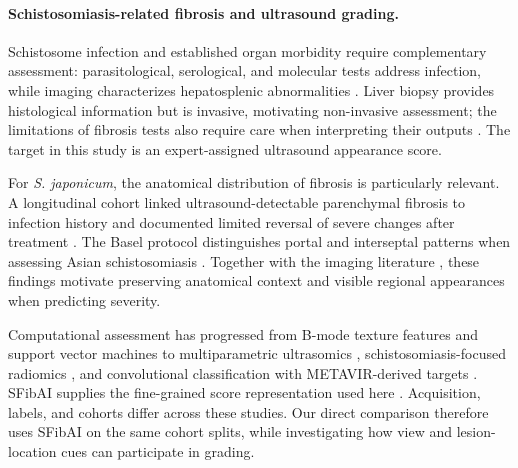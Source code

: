 \paragraph{Schistosomiasis-related fibrosis and ultrasound grading.}
Schistosome infection and established organ morbidity require complementary assessment: parasitological, serological, and molecular tests address infection, while imaging characterizes hepatosplenic abnormalities \citep{weerakoon2015diagnosis,sah2015imaging}. Liver biopsy provides histological information but is invasive, motivating non-invasive assessment; the limitations of fibrosis tests also require care when interpreting their outputs \citep{bravo2001biopsy,patel2020limitations}. The target in this study is an expert-assigned ultrasound appearance score.

For \emph{S. japonicum}, the anatomical distribution of fibrosis is particularly relevant. A longitudinal cohort linked ultrasound-detectable parenchymal fibrosis to infection history and documented limited reversal of severe changes after treatment \citep{carlton2010morbidity}. The Basel protocol distinguishes portal and interseptal patterns when assessing Asian schistosomiasis \citep{richter2025basel}. Together with the imaging literature \citep{sah2015imaging}, these findings motivate preserving anatomical context and visible regional appearances when predicting severity.

Computational assessment has progressed from B-mode texture features and support vector machines \citep{yeh2003fibrosis} to multiparametric ultrasomics \citep{li2019ultrasomics}, schistosomiasis-focused radiomics \citep{guo2024radiomics}, and convolutional classification with METAVIR-derived targets \citep{lee2020ultrasound}. SFibAI supplies the fine-grained score representation used here \citep{xu2026sfibai}. Acquisition, labels, and cohorts differ across these studies. Our direct comparison therefore uses SFibAI on the same cohort splits, while investigating how view and lesion-location cues can participate in grading.

